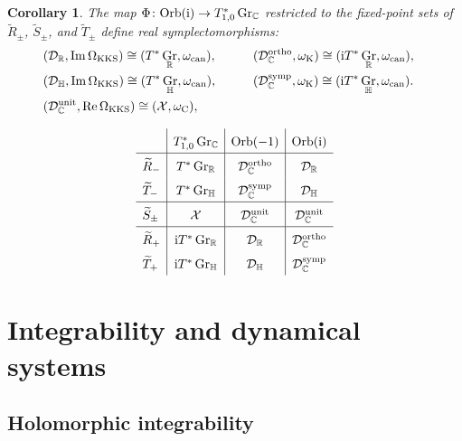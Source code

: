 \documentclass[pdftex]{sigma}
\numberwithin{equation}{section}
\newtheorem{Corollary}[Theorem]{Corollary}
\DeclareMathOperator{\Imag}{Im}
\DeclareMathOperator{\Real}{Re}
\DeclareMathOperator{\Gr}{Gr}
\newcommand{\R}{\mathbb{R}}
\newcommand{\C}{\mathbb{C}}
\newcommand{\D}{\mathcal{D}}
\newcommand{\Q}{\mathbb{H}}
\begin{document}
\begin{Corollary}
	The map $\Phi\colon{\rm Orb}({\rm i})\rightarrow T^*_{1,0}\Gr_\C$ restricted to the fixed-point sets of $\widetilde{R}_\pm$, $\widetilde{S}_\pm$, and $\widetilde{T}_\pm$ define real symplectomorphisms:
	\begin{alignat*}{3}
		&(\D_\R,\Imag\Omega_{\rm KKS})\cong(T^*\Gr_\R,\omega_{\rm can}),\qquad && (\D_\C^{\rm ortho},\omega_\textup{K})\cong({\rm i}T^*\Gr_\R,\omega_{\rm can}),& \\
		&(\D_\Q,\Imag\Omega_{\rm KKS})\cong(T^*\Gr_\Q,\omega_{\rm can}),\qquad && (\D_\C^{\rm symp},\omega_\textup{K})\cong({\rm i}T^*\Gr_\Q,\omega_{\rm can}).& \\
		&(\D_\C^{\rm unit},\Real\Omega_{\rm KKS})\cong(\mathcal{X},\omega_\textup{C}),&
	\end{alignat*}
\end{Corollary}

\begin{table}[t]
		\caption{\label{RST_table}Each row represents a brane of $\tilde{M}$. The table follows the template in \eqref{little_table} to demonstrate which submanifolds are real-/imaginary-symplectic forms and complex-Lagrangian submanifolds of $T^*_{1,0}\Gr_\C$ and~${\rm Orb}(\zeta)$.}
$$\arraycolsep=5pt\def\arraystretch{1.6}
		\begin{array}{l|c|c|c}
			&T^*_{1,0}\Gr_\C & {\rm Orb}(-1) & {\rm Orb}({\rm i})\\\hline
			\widetilde{R}_-&T^*\Gr_\R & \D_\C^\text{ortho} & \D_\R \\
			\widetilde{T}_-&T^*\Gr_\Q & \D_\C^\text{symp}& \D_\Q \\ \hline
			\widetilde{S}_\pm & \mathcal{X} & \D_\C^{\rm unit} & \D_\C^{\rm unit} \\ \hline
			\widetilde{R}_+ & {\rm i}T^*\Gr_\R & \D_\R & \D_\C^\text{ortho} \\
			\widetilde{T}_+ & {\rm i}T^*\Gr_\Q & \D_\Q & \D_\C^\text{symp}
		\end{array}
$$
\end{table}

\section{Integrability and dynamical systems}

\subsection{Holomorphic integrability}
\end{document}
